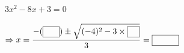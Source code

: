 $3x^2-8x+3=0$\par\noindent $\Rightarrow x=\dfrac{-(\blank[2em])\pm\sqrt{(-4)^2-3\times\blank}}{3}=\blank[3.2em]$
